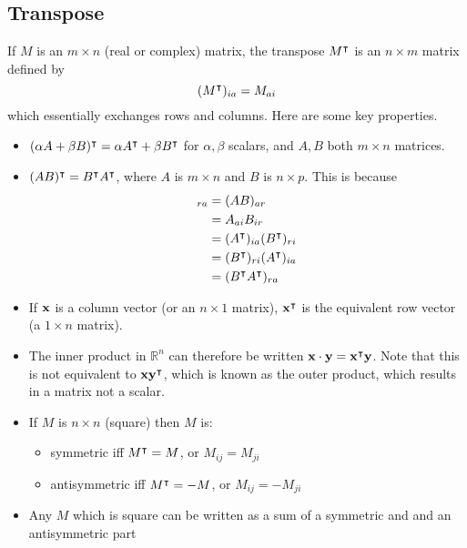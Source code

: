 \subsection{Transpose}
If \(M\) is an \(m \times n\) (real or complex) matrix, the transpose \(M^\intercal\) is an \(n \times m\) matrix defined by
\[
	(M^\intercal)_{ia} = M_{ai}
\]
which essentially exchanges rows and columns.
Here are some key properties.
\begin{itemize}
	\item \((\alpha A + \beta B)^\intercal = \alpha A^\intercal + \beta B^\intercal\) for \(\alpha, \beta\) scalars, and \(A, B\) both \(m \times n\) matrices.
	\item \((AB)^\intercal = B^\intercal A^\intercal\), where \(A\) is \(m \times n\) and \(B\) is \(n \times p\).
	      This is because
	      \begin{align*}
		      [(AB)^\transpose]_{ra} & = (AB)_{ar}                               \\
		                             & = A_{ai} B_{ir}                           \\
		                             & = (A^\transpose)_{ia} (B^\transpose)_{ri} \\
		                             & = (B^\transpose)_{ri} (A^\transpose)_{ia} \\
		                             & = (B^\transpose A^\transpose)_{ra}
	      \end{align*}
	\item If \(\vb x\) is a column vector (or an \(n \times 1\) matrix), \(\vb x^\intercal\) is the equivalent row vector (a \(1 \times n\) matrix).
	\item The inner product in \(\mathbb R^n\) can therefore be written \(\vb x \cdot \vb y = \vb x^\intercal \vb y\).
	      Note that this is not equivalent to \(\vb x \vb y^\intercal\), which is known as the outer product, which results in a matrix not a scalar.
	\item If \(M\) is \(n \times n\) (square) then \(M\) is:
	      \begin{itemize}
		      \item symmetric iff \(M^\intercal = M\), or \(M_{ij} = M_{ji}\)
		      \item antisymmetric iff \(M^\intercal = -M\), or \(M_{ij} = -M_{ji}\)
	      \end{itemize}
	\item Any \(M\) which is square can be written as a sum of a symmetric and and an antisymmetric part

\end{itemize}
